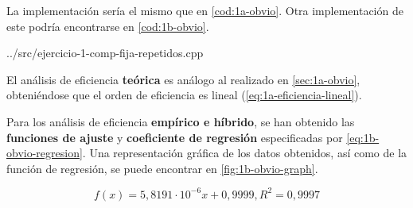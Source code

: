 
La implementación sería el mismo que en \ref{cod:1a-obvio}. Otra implementación de este podría encontrarse en \ref{cod:1b-obvio}. 


{../src/ejercicio-1-comp-fija-repetidos.cpp} 


El análisis de eficiencia \textbf{teórica} es análogo al realizado en \ref{sec:1a-obvio}, obteniéndose 
que el orden de eficiencia es lineal (\ref{eq:1a-eficiencia-lineal}). 

Para los análisis de eficiencia \textbf{empírico e híbrido}, se han obtenido las \textbf{funciones de ajuste}
y \textbf{coeficiente de regresión} especificadas por \ref{eq:1b-obvio-regresion}. Una representación
gráfica de los datos obtenidos, así como de la función de regresión, se puede encontrar en \ref{fig:1b-obvio-graph}. 

\begin{equation}
    \boxed{f(x) = 5,8191 \cdot 10 ^{-6} x + 0,9999, R^2 = 0,9997}
    \label{eq:1b-obvio-regresion}
\end{equation}

